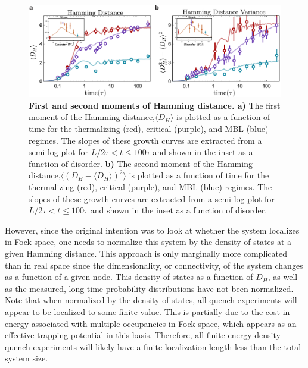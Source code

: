\begin{figure}[t!]
		\includegraphics[width=\columnwidth]{figures/ch7/hamming_dist_slopes_fig.pdf} 
		\caption{\textbf{First and second moments of Hamming distance. a)} The first moment of the Hamming distance,$\langle D_H \rangle$ is plotted as a function of time for the thermalizing (red), critical (purple), and MBL (blue) regimes. The slopes of these growth curves are extracted from a semi-log plot for $L/2 \tau < t \leq 100 \tau$ and shown in the inset as a function of disorder. \textbf{b)}  The second moment of the Hamming distance,$\langle \left ( D_H - \langle D_H \rangle  \right )^2 \rangle$ is plotted as a function of time for the thermalizing (red), critical (purple), and MBL (blue) regimes. The slopes of these growth curves are extracted from a semi-log plot for $L/2 \tau < t \leq 100 \tau$ and shown in the inset as a function of disorder.}
		\label{fig:hamDmoments}	
\end{figure}

However, since the original intention was to look at whether the system localizes in Fock space, one needs to normalize this system by the density of states at a given Hamming distance. This approach is only marginally more complicated than in real space since the dimensionality, or connectivity, of the system changes as a function of a given node. This density of states as a function of $D_H$, as well as the measured, long-time probability distributions have not been normalized. Note that when normalized by the density of states, all quench experiments will appear to be localized to some finite value. This is partially due to the cost in energy associated with multiple occupancies in Fock space, which appears as an effective trapping potential in this basis. Therefore, all finite energy density quench experiments will likely have a finite localization length less than the total system size.

%
%
%

